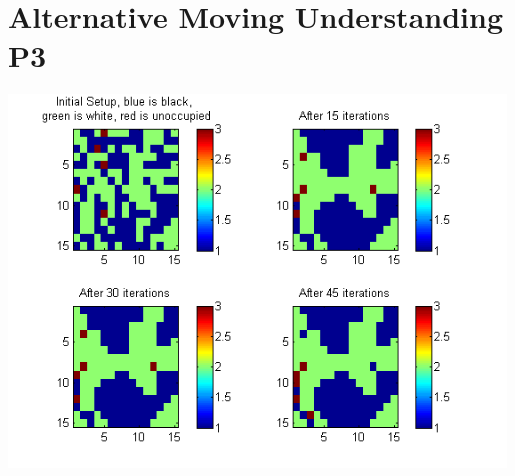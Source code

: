 \documentclass{article}
\begin{document}
	\section{Alternative Moving Understanding P3}
	
\includegraphics[width=0.99\textwidth]{Moving.png}
\end{document}
